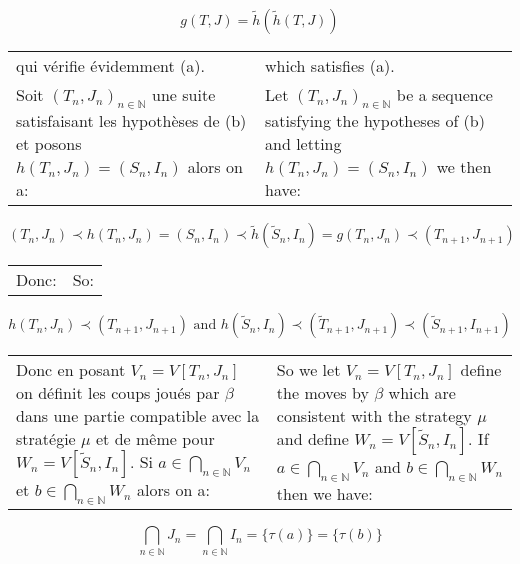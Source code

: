 \documentclass[12pt]{article}
\theoremstyle{plain}
\theoremstyle{definition}
\theoremstyle{remark}
\begin{document}
\[g(T,J)=\widetilde{h}(\widetilde{h}(T,J))\]

\begin{tabular}{p{2.8in} p{2.8in}}

qui v\'erifie \'evidemment (a).

&

which satisfies (a).

\\

Soit $(T_n,J_n)_{n\in\mathbb{N}}$ une suite satisfaisant les hypoth\`eses de (b) et posons $h(T_n,J_n)=(S_n,I_n)$ alors on a:

&

Let $(T_n,J_n)_{n\in\mathbb{N}}$ be a sequence satisfying the hypotheses of (b) and letting $h(T_n,J_n)=(S_n,I_n)$ we then have:

\end{tabular}

\[
(T_n,J_n)\prec h(T_n,J_n) = (S_n,I_n) \prec \widetilde{h}(\widetilde{S}_n,I_n)=g(T_n,J_n)\prec(T_{n+1},J_{n+1})
\]

\begin{tabular}{p{2.8in} p{2.8in}}

Donc:

&

So:

\end{tabular}

\[
h(T_n,J_n)\prec (T_{n+1},J_{n+1}) \text{ and } h(\widetilde{S}_n,I_n)\prec (\widetilde{T}_{n+1},J_{n+1})\prec (\widetilde{S}_{n+1},I_{n+1})
\]

\begin{tabular}{p{2.8in} p{2.8in}}

Donc en posant $V_n=V[T_n,J_n]$ on d\'efinit les coups jou\'es par $\beta$ dans une partie compatible avec la strat\'egie $\mu$ et de m\^eme pour $W_n=V[\widetilde{S}_n,I_n]$. Si $a \in \bigcap_{n\in\mathbb{N}} V_n$ et $b \in \bigcap_{n\in\mathbb{N}} W_n$ alors on a:

&

So we let $V_n=V[T_n,J_n]$ define the moves by $\beta$ which are consistent with the strategy $\mu$ and define $W_n=V[\widetilde{S}_n,I_n]$. If $a \in \bigcap_{n\in\mathbb{N}} V_n$ and $b \in \bigcap_{n\in\mathbb{N}} W_n$ then we have:

\end{tabular}

\setcounter{equation}{0}
\begin{equation}
\bigcap_{n\in\mathbb{N}} J_n = \bigcap_{n\in\mathbb{N}} I_n = \{\tau(a)\} = \{\tau(b)\}
\end{equation}
\end{document}
